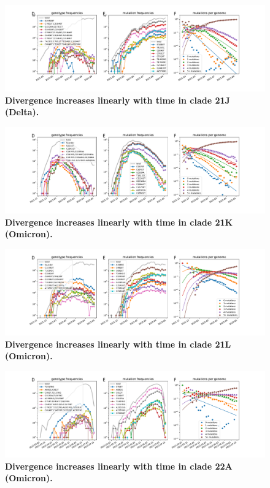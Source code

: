 \begin{figure}
    \includegraphics[width=\textwidth]{figures/counts/21J_counts.pdf}
    \caption{{\bf Divergence increases linearly with time in clade 21J (Delta).}
    \label{fig:21J_counts}}
\end{figure}

\begin{figure}
    \includegraphics[width=\textwidth]{figures/counts/21K_counts.pdf}
    \caption{{\bf Divergence increases linearly with time in clade 21K (Omicron).}
    \label{fig:21K_counts}}
\end{figure}

\begin{figure}
    \includegraphics[width=\textwidth]{figures/counts/21L_counts.pdf}
    \caption{{\bf Divergence increases linearly with time in clade 21L (Omicron).}
    \label{fig:21L_counts}}
\end{figure}

\begin{figure}
    \includegraphics[width=\textwidth]{figures/counts/22A_counts.pdf}
    \caption{{\bf Divergence increases linearly with time in clade 22A (Omicron).}
    \label{fig:22A_counts}}
\end{figure}

